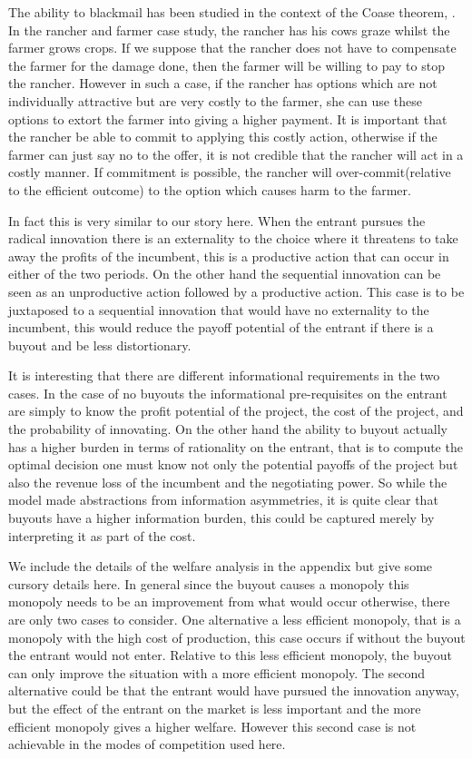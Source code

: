 The ability to blackmail has been studied in the context of the Coase theorem, \cite{Dem}. In the rancher and farmer case study, the rancher has his cows graze whilst the farmer grows crops. If we suppose that the rancher does not have to compensate the farmer for the damage done, then the farmer will be willing to pay to stop the rancher. However in such a case, if the rancher has options which are not individually attractive but are very costly to the farmer, she can use these options to extort the farmer into giving a higher payment. It is important that the rancher be able to commit to applying this costly action, otherwise if the farmer can just say no to the offer, it is not credible that the rancher will act in a costly manner. If commitment is possible, the rancher will over-commit(relative to the efficient outcome) to the option which causes harm to the farmer.

In fact this is very similar to our story here. When the entrant pursues the radical innovation there is an externality to the choice where it threatens to take away the profits of the incumbent, this is a productive action that can occur in either of the two periods. On the other hand the sequential innovation can be seen as an unproductive action followed by a productive action. This case is to be juxtaposed to a sequential innovation that would have no externality to the incumbent, this would reduce the payoff potential of the entrant if there is a buyout and be less distortionary. 

It is interesting that there are different informational requirements in the two cases. In the case of no buyouts the informational pre-requisites on the entrant are simply to know the profit potential of the project, the cost of the project, and the probability of innovating. On the other hand the ability to buyout actually has a higher burden in terms of rationality on the entrant, that is to compute the optimal decision one must know not only the potential payoffs of the project but also the revenue loss of the incumbent and the negotiating power. So while the model made abstractions from information asymmetries, it is quite clear that buyouts have a higher information burden, this could be captured merely by interpreting it as part of the cost. 

We include the details of the welfare analysis in the appendix but give some cursory details here. In general since the buyout causes a monopoly this monopoly needs to be an improvement from what would occur otherwise, there are only two cases to consider. One alternative a less efficient monopoly, that is a monopoly with the high cost of production, this case occurs if without the buyout the entrant would not enter. Relative to this less efficient monopoly, the buyout can only improve the situation with a more efficient monopoly. The second alternative could be that the entrant would have pursued the innovation anyway, but the effect of the entrant on the market is less important and the more efficient monopoly gives a higher welfare. However this second case is not achievable in the modes of competition used here.

